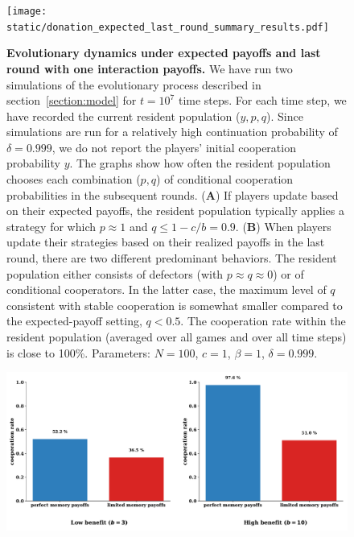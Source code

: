 \documentclass[11pt]{article}
\theoremstyle{plainCl1}
\theoremstyle{plainCl2}
\begin{document}
\begin{figure}[!htbp]
    \centering
    \texttt{[image: static/donation\_expected\_last\_round\_summary\_results.pdf]}
    \caption{{\bf Evolutionary dynamics under expected payoffs and last round with one interaction payoffs.} 
    We have run two simulations of the evolutionary process described in
    section~\ref{section:model} for $t\!=\!10^7$ time steps. For each time step,
    we have recorded the current resident population ($y,p,q$). Since
    simulations are run for a relatively high continuation probability of
    $\delta\!=\!0.999$, we do not report the players' initial cooperation
    probability $y$. The graphs show how often the resident population chooses
    each combination ($p,q$) of conditional cooperation probabilities in the
    subsequent rounds. ({\bf A}) If players update based on their expected
    payoffs, the resident population typically applies a strategy for which
    $p\!\approx\!1$ and $q\!\le\!1\!-\!c/b\!=\!0.9$. ({\bf B}) When players
    update their strategies based on their realized payoffs in the last round,
    there are two different predominant behaviors. The resident population
    either consists of defectors (with $p\!\approx\!q\!\approx\!0$) or of
    conditional cooperators. In the latter case, the maximum level of $q$
    consistent with stable cooperation is somewhat smaller compared to the
    expected-payoff setting, $q\!<\!0.5$. The cooperation rate within the
    resident population (averaged over all games and over all time steps) is
    close to 100\%. Parameters: $N\!=\!100$, $c\!=\!1$, $\beta\!=\!1$,
    $\delta\!=\!0.999$.}
    \label{fig:expected_and_stochastic_for_donation}
\end{figure}

\begin{figure}[!htbp]
  \centering
  \includegraphics[width=.9\textwidth]{static/cooperation_rates_expected_and_stochastic_for_donation_game.pdf}
\end{figure}
\end{document}
